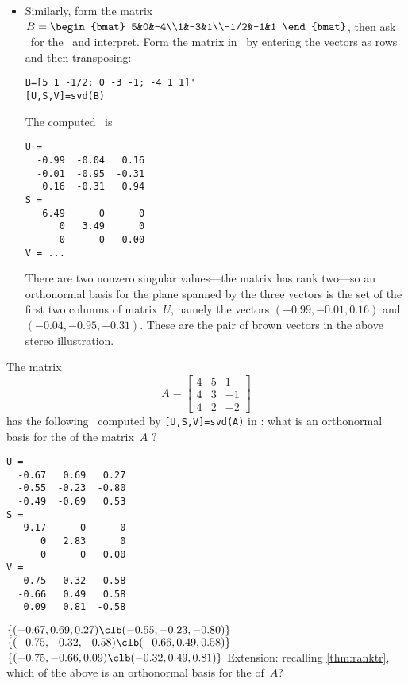 \begin{example}
\begin{solution}
\begin{itemize}
\item Similarly, form the matrix 
\(B=\begin{bmat} 5&0&-4\\1&-3&1\\-1/2&-1&1 \end{bmat}\),
then ask \script\ for the \svd\ and interpret.
Form the matrix in \script\ by entering the vectors as rows and then transposing:
\begin{verbatim}
B=[5 1 -1/2; 0 -3 -1; -4 1 1]'
[U,S,V]=svd(B)
\end{verbatim}
\setbox\ajrqrbox\hbox{}%
\marginajrbox%
The computed \svd\ is \twodp
\begin{verbatim}
U =
  -0.99  -0.04   0.16
  -0.01  -0.95  -0.31
   0.16  -0.31   0.94
S =
   6.49      0      0
      0   3.49      0
      0      0   0.00
V = ...
\end{verbatim}
There are two nonzero singular values---the matrix has rank two---so an orthonormal basis for the plane spanned by the three vectors is the set of the first two columns of matrix~\(U\), namely the vectors  \((-0.99,-0.01,0.16)\) and \((-0.04,-0.95,-0.31)\).
These are the pair of brown vectors in the above stereo illustration.
\end{itemize} 
\end{solution}
\end{example}




\begin{activity}
The matrix
\begin{equation*}
A=\begin{bmatrix} 4&5&1
\\4&3&-1
\\4&2&-2 \end{bmatrix}
\end{equation*}
has the following \svd\ computed by \verb|[U,S,V]=svd(A)| in \script: what is an orthonormal basis for the  of the matrix~\(A\) \twodp?
\begin{verbatim}
U =
  -0.67   0.69   0.27
  -0.55  -0.23  -0.80
  -0.49  -0.69   0.53
S =
   9.17      0      0
      0   2.83      0
      0      0   0.00
V =
  -0.75  -0.32  -0.58
  -0.66   0.49   0.58
   0.09   0.81  -0.58
\end{verbatim}
{\(\{(-0.67,0.69,0.27)\clb (-0.55,-0.23,-0.80)\}\)}
{\(\{(-0.75,-0.32,-0.58)\clb (-0.66,0.49,0.58)\}\)}
{\(\{(-0.75,-0.66,0.09)\clb (-0.32,0.49,0.81)\}\)}
Extension: recalling \cref{thm:ranktr}, which of the above is an orthonormal basis for the  of~\(A\)?
\end{activity}




